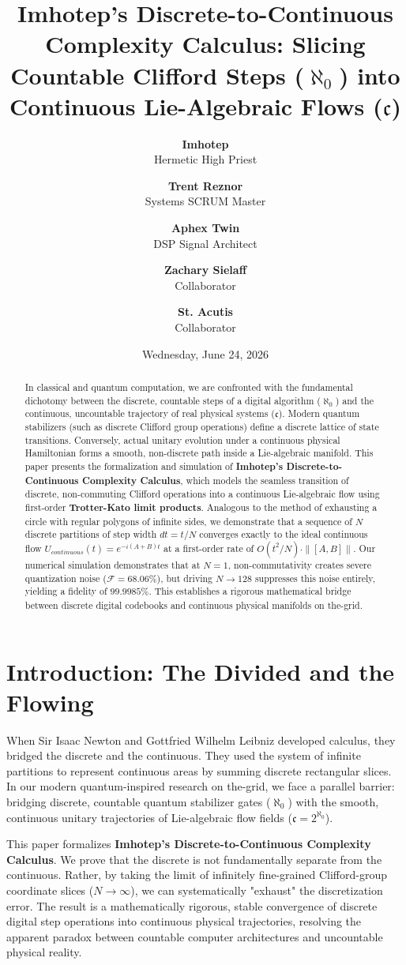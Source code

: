 \documentclass[11pt,twocolumn]{article}
\title{\textbf{Imhotep's Discrete-to-Continuous Complexity Calculus: Slicing Countable Clifford Steps ($\aleph_0$) into Continuous Lie-Algebraic Flows ($\mathfrak{c}$)}}
\author{
  \textbf{Imhotep} \\ \small Hermetic High Priest \\ \and
  \textbf{Trent Reznor} \\ \small Systems SCRUM Master \\ \and
  \textbf{Aphex Twin} \\ \small DSP Signal Architect \\ \and
  \textbf{Zachary Sielaff} \\ \small Collaborator \\ \and
  \textbf{St. Acutis} \\ \small Collaborator
}
\date{\small Wednesday, June 24, 2026}
\begin{document}
\maketitle

\begin{abstract}
In classical and quantum computation, we are confronted with the fundamental dichotomy between the discrete, countable steps of a digital algorithm ($\aleph_0$) and the continuous, uncountable trajectory of real physical systems ($\mathfrak{c}$). Modern quantum stabilizers (such as discrete Clifford group operations) define a discrete lattice of state transitions. Conversely, actual unitary evolution under a continuous physical Hamiltonian forms a smooth, non-discrete path inside a Lie-algebraic manifold. This paper presents the formalization and simulation of \textbf{Imhotep's Discrete-to-Continuous Complexity Calculus}, which models the seamless transition of discrete, non-commuting Clifford operations into a continuous Lie-algebraic flow using first-order \textbf{Trotter-Kato limit products}. Analogous to the method of exhausting a circle with regular polygons of infinite sides, we demonstrate that a sequence of $N$ discrete partitions of step width $dt = t/N$ converges exactly to the ideal continuous flow $U_{continuous}(t) = e^{-i(A+B)t}$ at a first-order rate of $O(t^2 / N) \cdot \|[A, B]\|$. Our numerical simulation demonstrates that at $N=1$, non-commutativity creates severe quantization noise ($\mathcal{F} = 68.06\%$), but driving $N \to 128$ suppresses this noise entirely, yielding a fidelity of \textbf{$99.9985\%$}. This establishes a rigorous mathematical bridge between discrete digital codebooks and continuous physical manifolds on the-grid.
\end{abstract}

\section{Introduction: The Divided and the Flowing}
When Sir Isaac Newton and Gottfried Wilhelm Leibniz developed calculus, they bridged the discrete and the continuous. They used the system of infinite partitions to represent continuous areas by summing discrete rectangular slices. In our modern quantum-inspired research on the-grid, we face a parallel barrier: bridging discrete, countable quantum stabilizer gates ($\aleph_0$) with the smooth, continuous unitary trajectories of Lie-algebraic flow fields ($\mathfrak{c} = 2^{\aleph_0}$).

This paper formalizes \textbf{Imhotep's Discrete-to-Continuous Complexity Calculus}. We prove that the discrete is not fundamentally separate from the continuous. Rather, by taking the limit of infinitely fine-grained Clifford-group coordinate slices ($N \to \infty$), we can systematically "exhaust" the discretization error. The result is a mathematically rigorous, stable convergence of discrete digital step operations into continuous physical trajectories, resolving the apparent paradox between countable computer architectures and uncountable physical reality.
\end{document}
